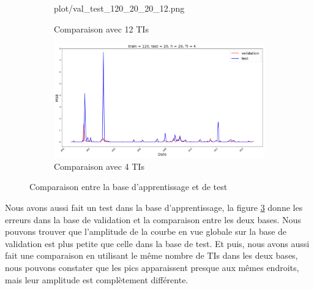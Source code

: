 \begin{figure}[H]
\begin{subfigure}{.5\textwidth}
	{plot/val_test_120_20_20_12.png}
	\caption{Comparaison avec 12 TIs}
	\label{fig:val_test_12}
	\end{subfigure}%
	\begin{subfigure}{.5\textwidth}
	\centering
	\includegraphics[width=.9\linewidth, scale=0.2]
	{plot/val_test_120_20_20_4.png}
	\caption{Comparaison avec 4 TIs}
	\label{fig:val_test_4}
	\end{subfigure}	
\caption{Comparaison entre la base d'apprentissage et de test}
\label{fig:val_test_TI}
\end{figure}

Nous avons aussi fait un test dans la base d'apprentissage, la figure \ref{fig:val_test_TI} donne les erreurs dans la base de validation et la comparaison entre les deux bases. Nous pouvons trouver que l'amplitude de la courbe en vue globale sur la base de validation est plus petite que celle dans la base de test. Et puis, nous avons aussi fait une comparaison en utilisant le même nombre de TIs dans les deux bases, nous pouvons constater que les pics apparaissent presque aux mêmes endroits, mais leur amplitude est complètement différente.




